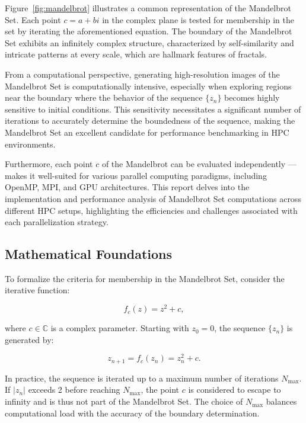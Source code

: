 \documentclass[
	report, %
	11pt, %
]{CSUniSchoolLabReport}
\newcounter{ct}
\begin{document}
\noindent Figure~\ref{fig:mandelbrot} illustrates a common representation of the Mandelbrot Set. Each point \( c = a + bi \) in the complex plane is tested for membership in the set by iterating the aforementioned equation. The boundary of the Mandelbrot Set exhibits an infinitely complex structure, characterized by self-similarity and intricate patterns at every scale, which are hallmark features of fractals.

From a computational perspective, generating high-resolution images of the Mandelbrot Set is computationally intensive, especially when exploring regions near the boundary where the behavior of the sequence \( \{ z_n \} \) becomes highly sensitive to initial conditions. This sensitivity necessitates a significant number of iterations to accurately determine the boundedness of the sequence, making the Mandelbrot Set an excellent candidate for performance benchmarking in HPC environments.

Furthermore, each point \( c \) of the Mandelbrot can be evaluated independently — makes it well-suited for various parallel computing paradigms, including OpenMP, MPI, and GPU architectures. This report delves into the implementation and performance analysis of Mandelbrot Set computations across different HPC setups, highlighting the efficiencies and challenges associated with each parallelization strategy.
\pagebreak

\subsection{Mathematical Foundations}

To formalize the criteria for membership in the Mandelbrot Set, consider the iterative function:

\begin{equation}
	f_c(z) = z^2 + c,
\end{equation}

where \( c \in \mathbb{C} \) is a complex parameter. Starting with \( z_0 = 0 \), the sequence \( \{ z_n \} \) is generated by:

\begin{equation}
	z_{n+1} = f_c(z_n) = z_n^2 + c.
\end{equation}


In practice, the sequence is iterated up to a maximum number of iterations \( N_{\text{max}} \). If \( |z_n| \) exceeds 2 before reaching \( N_{\text{max}} \), the point \( c \) is considered to escape to infinity and is thus not part of the Mandelbrot Set. The choice of \( N_{\text{max}} \) balances computational load with the accuracy of the boundary determination.
\end{document}
